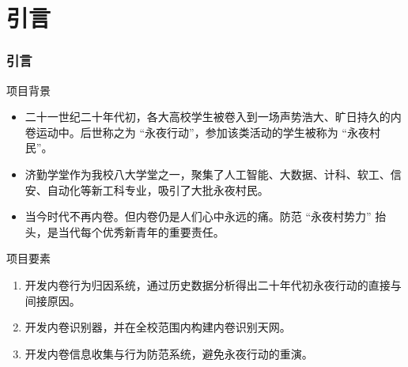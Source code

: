 %
%
%
%
\section{引言}
    \begin{frame}
    \frametitle{引言}
        \footnotesize
        \begin{block}{项目背景}
            \begin{itemize}
                \item 二十一世纪二十年代初，各大高校学生被卷入到一场声势浩大、旷日持久的内卷运动中。后世称之为 “永夜行动”，参加该类活动的学生被称为 “永夜村民”。
                \item 济勤学堂作为我校八大学堂之一，聚集了人工智能、大数据、计科、软工、信安、自动化等新工科专业，吸引了大批永夜村民。
                \item 当今时代不再内卷。但内卷仍是人们心中永远的痛。防范 “永夜村势力” 抬头，是当代每个优秀新青年的重要责任。
            \end{itemize}
        \end{block}

        \begin{block}{项目要素}
            \begin{enumerate}
                \item 开发内卷行为归因系统，通过历史数据分析得出二十年代初永夜行动的直接与间接原因。
                \item 开发内卷识别器，并在全校范围内构建内卷识别天网。
                \item 开发内卷信息收集与行为防范系统，避免永夜行动的重演。
            \end{enumerate}
        \end{block}
    \end{frame}

